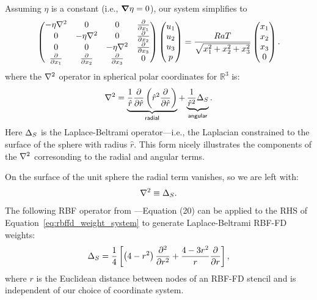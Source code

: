 Assuming $\eta$ is a constant (i.e., $\mbox{\boldmath$ \nabla $} \eta = 0$), our system simplifies to
\begin{align}
\begin{pmatrix}
-\eta \Laplacian & 0 & 0 & \pd{}{x_1} \\ 
0 & -\eta \Laplacian & 0 & \pd{}{x_2} \\ 
0 & 0 & -\eta \Laplacian & \pd{}{x_3} \\ 
\pd{}{x_1} & \pd{}{x_2} & \pd{}{x_3} & 0 \\
\end{pmatrix} \begin{pmatrix}
u_1 \\ u_2 \\ u_3 \\ p 
\end{pmatrix} = \frac{RaT}{\sqrt{x_1^2 + x_2^2 + x_3^2}}\begin{pmatrix} x_1 \\ x_2 \\ x_3 \\ 0\end{pmatrix}.
\label{eq:stokes_constant_viscosity}
\end{align}
where the $\Laplacian$ operator in spherical polar coordinates for $\mathbb{R}^3$ is: 
\begin{align} 
\nabla^2 = \underbrace{\frac{1}{\hat{r}} \frac{\partial }{\partial \hat{r}} \left( \hat{r}^{2} \frac{\partial }{\partial \hat{r}}  \right)}_{\mathsf{radial}} + \underbrace{\frac{1}{\hat{r}^2} \Delta_{S}}_{\mathsf{angular}}. \label{eq:laplacian_in_spherical}
\end{align}
Here $\LaplaceBeltrami$ is the Laplace-Beltrami operator---i.e., the Laplacian constrained to the surface of the sphere with radius $\hat{r}$. This form nicely illustrates the components of the $\Laplacian$ corresonding to the radial and angular terms. 

On the surface of the unit sphere the radial term vanishes, so we are left with:
\begin{align}
\nabla^2 \equiv \Delta_S . 
\end{align}
The following RBF operator from \cite{WrightFlyerYuen10}---Equation (20) can be applied to the RHS of Equation~\ref{eq:rbffd_weight_system} to generate Laplace-Beltrami RBF-FD weights: 
\begin{align} 
\Delta_S = \frac{1}{4} \left[ \left(4-r^2\right) \frac{\partial^2 }{\partial r^2} + \frac{4-3r^2}{r} \frac{\partial }{\partial r} \right],
\end{align} 
where $r$ is the Euclidean distance between nodes of an RBF-FD stencil and is independent of our choice of coordinate system. 


